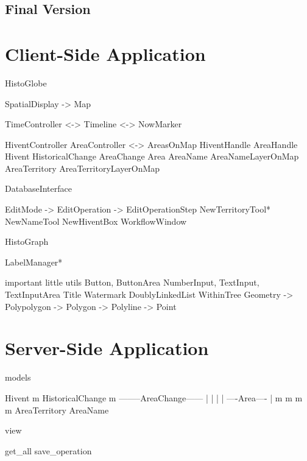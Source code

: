 
\subsection{Final Version} %
\label{ssub:final_version}




\section{Client-Side Application} %
\label{sub:client_side_application}



HistoGlobe

SpatialDisplay -> Map

TimeController  <-> Timeline
                <-> NowMarker

HiventController                AreaController <->  AreasOnMap
HiventHandle                    AreaHandle
Hivent
HistoricalChange    AreaChange  Area
                                AreaName            AreaNameLayerOnMap
                                AreaTerritory       AreaTerritoryLayerOnMap

DatabaseInterface

EditMode -> EditOperation -> EditOperationStep
NewTerritoryTool* NewNameTool NewHiventBox
WorkflowWindow

HistoGraph

LabelManager*

important little utils
  Button, ButtonArea
  NumberInput, TextInput, TextInputArea
  Title
  Watermark
  DoublyLinkedList
  WithinTree
  Geometry -> Polypolygon -> Polygon -> Polyline -> Point







\section{Server-Side Application} %
\label{sub:server_side_application}

models

           Hivent
             m
       HistoricalChange
             m
  --------AreaChange------
  |          |           |
  |     ----Area----     |
  m     m          m     m
AreaTerritory      AreaName


view

get\_all
save\_operation








